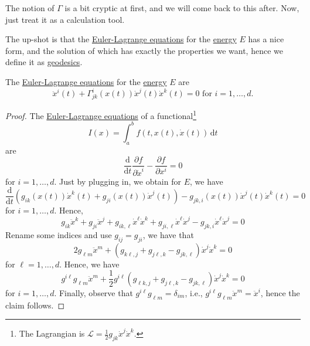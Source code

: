 \begin{remark}
	The notion of \(\Gamma \) is a bit cryptic at first, and we will come back to this after. Now, just treat it as a calculation tool.
\end{remark}

The up-shot is that the \href{https://en.wikipedia.org/wiki/Euler%E2%80%93Lagrange_equation}{Euler-Lagrange equations} for the \hyperref[def:energy]{energy} \(E\) has a nice form, and the solution of which has exactly the properties we want, hence we define it as \hyperref[def:geodesic]{geodesics}. 

\begin{proposition}\label{prop:Euler-Lagrange-eq-geodesic}
	The \href{https://en.wikipedia.org/wiki/Euler-Lagrange_equation}{Euler-Lagrange equations} for the \hyperref[def:energy]{energy} \(E\) are
	\begin{equation}\label{eq:geodesic}
		\ddot{x}^i(t) + \Gamma ^{i}_{jk}(x(t)) \dot{x}^j(t)\dot{x}^k(t) = 0 \text{ for } i = 1, \dots , d.
	\end{equation}
\end{proposition}
\begin{proof}
	The \href{https://en.wikipedia.org/wiki/Euler-Lagrange_equation}{Euler-Lagrange equations} of a functional\footnote{The Lagrangian is \(\mathcal{L} = \frac{1}{2} g_{jk} \dot{x}^j \dot{x} ^k\).}
	\[
		I(x) = \int_{a}^{b} f(t, x(t), \dot{x}(t)) \,\mathrm{d}t
	\]
	are
	\[
		\frac{\mathrm{d}}{\mathrm{d}t} \frac{\partial f}{\partial \dot{x}^i} - \frac{\partial f}{\partial x^i} = 0
	\]
	for \(i = 1, \dots , d\). Just by plugging in, we obtain for \(E\), we have
	\[
		\frac{\mathrm{d}}{\mathrm{d}t} \left( g_{ik} (x(t)) \dot{x}^k (t) + g_{ji}(x(t))\dot{x}^j(t) \right) - g_{jk, i}(x(t))\dot{x}^j(t)\dot{x}^k(t) = 0
	\]
	for \(i = 1, \dots , d\). Hence,
	\[
		g_{ik} \ddot{x}^k + g_{ji}\ddot{x}^j + g_{ik, \ell }\dot{x}^{\ell }\dot{x}^k + g_{ji, \ell }\dot{x}^{\ell}\dot{x}^j - g_{jk, i} \dot{x}^{\ell } \dot{x}^j = 0
	\]
	Rename some indices and use \(g_{ij} = g_{ji} \), we have that
	\[
		2g_{\ell m}\ddot{x}^m + \left( g_{k \ell , j}+ g_{j \ell , k} - g_{jk, \ell} \right) \dot{x}^j \dot{x}^k = 0
	\]
	for \(\ell = 1, \dots , d\). Hence, we have
	\[
		g^{i \ell }g_{\ell m}\ddot{x}^m + \frac{1}{2} g^{i \ell } \left( g_{\ell k, j} + g_{j \ell , k} - g_{jk, \ell } \right) \dot{x}^j \dot{x}^k = 0
	\]
	for \(i = 1, \dots , d\). Finally, observe that \(g^{i \ell } g_{\ell m} = \delta _{im}\), i.e., \(g^{i \ell } g_{\ell m} \ddot{x}^m = \ddot{x}^i\), hence the claim follows.
\end{proof}

